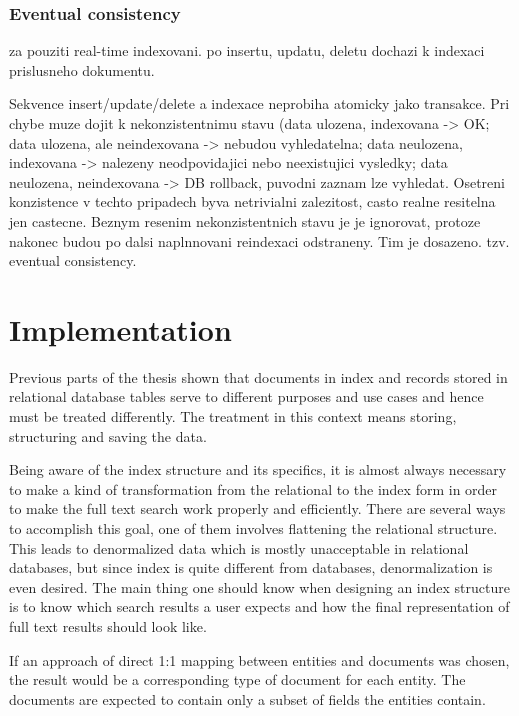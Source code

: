\documentclass[12pt, oneside, a4paper]{book}
\begin{document}
\subsection{Eventual consistency}

za pouziti real-time indexovani. po insertu, updatu, deletu dochazi
k indexaci prislusneho dokumentu.

Sekvence insert/update/delete a indexace neprobiha atomicky jako transakce.
Pri chybe muze dojit k nekonzistentnimu stavu (data ulozena,
indexovana -> OK; data ulozena, ale neindexovana -> nebudou vyhledatelna;
data neulozena, indexovana -> nalezeny neodpovidajici nebo neexistujici
vysledky; data neulozena, neindexovana -> DB rollback, puvodni
zaznam lze vyhledat. 
Osetreni konzistence v techto pripadech byva netrivialni zalezitost, casto realne resitelna jen castecne. 
Beznym resenim nekonzistentnich stavu je je ignorovat, protoze nakonec budou po dalsi naplnnovani reindexaci odstraneny. 
Tim je dosazeno. tzv. eventual consistency.



\chapter{Implementation}

Previous parts of the thesis shown that documents in index and records stored in relational database tables serve to different purposes and use cases and hence must be treated differently. 
The treatment in this context means storing, structuring and saving the data.

Being aware of the index structure and its specifics, it is almost always necessary to make a kind of transformation from the relational to the index form in order to make the full text search work properly and efficiently. 
There are several ways to accomplish this goal, one of them involves flattening the relational structure. 
This leads to denormalized data which is mostly unacceptable in relational databases, but since index is quite different from databases, denormalization is even desired. 
The main thing one should know when designing an index structure is to know which search results a user expects and how the final representation of full text results should look like.

If an approach of direct 1:1 mapping between entities and documents was chosen, the result would be a corresponding type of document for each entity. 
The documents are expected to contain only a subset of fields the entities contain.
\end{document}
